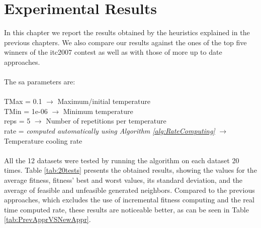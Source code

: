 \chapter{Experimental Results}
\label{chap:ExpResults}

In this chapter we report the results obtained by the heuristics explained in the previous chapters. We also compare our results against the ones of the top five winners of the \gls{itc2007} contest as well as with those of more up to date approaches.\\
\\
The \gls{sa} parameters are:\\
\\
TMax = 0.1 $\rightarrow$ Maximum/initial temperature\\
TMin = 1e-06 $\rightarrow$ Minimum temperature\\
reps = 5 $\rightarrow$ Number of repetitions per temperature\\
rate = \textit{computed automatically using Algorithm \ref{alg:RateComputing}} $\rightarrow$ Temperature cooling rate\\
\\
All the 12 datasets were tested by running the algorithm on each dataset 20 times. Table \ref{tab:20tests} presents the obtained results, showing the values for the average fitness, fitness' best and worst values, its standard deviation, and the average of feasible and unfeasible generated neighbors. Compared to the previous approaches, which excludes the use of incremental fitness computing and the real time computed rate, these results are noticeable better, as can be seen in Table \ref{tab:PrevApprVSNewAppr}. \\
\\
